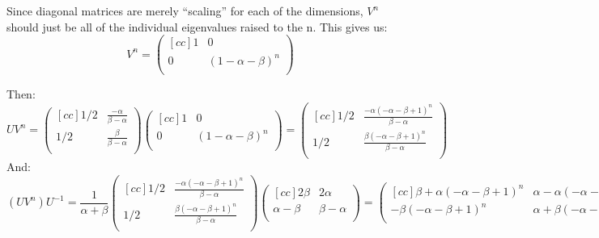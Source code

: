 \begin{enumerate}
\begin{enumerate}
       Since diagonal matrices are merely ``scaling'' for each of the dimensions, $V^n$ should just be all of the individual eigenvalues raised to the n. This gives us:
       $$
       V^n
       =
       \begin{pmatrix}[cc]
         1 & 0\\
         0 & (1-\alpha-\beta)^n\\
       \end{pmatrix}
       $$

       Then:
       $$
       UV^n
       =
       \begin{pmatrix}[cc]
         1/2 & \frac{-\alpha}{\beta - \alpha}\\
         1/2 & \frac{\beta}{\beta - \alpha}\\
       \end{pmatrix}       
       \begin{pmatrix}[cc]
         1 & 0\\
         0 & (1-\alpha-\beta)^n\\
       \end{pmatrix}
       =
       \begin{pmatrix}[cc]
         1/2 & \frac{-\alpha(-\alpha - \beta + 1)^n}{\beta - \alpha}\\
         1/2 & \frac{\beta(-\alpha - \beta + 1)^n}{\beta - \alpha}\\
       \end{pmatrix}      
       $$
       And:
       $$
       (UV^n)U^{-1}
       =
       \frac{1}{\alpha + \beta}
       \begin{pmatrix}[cc]
         1/2 & \frac{-\alpha(-\alpha - \beta + 1)^n}{\beta - \alpha}\\
         1/2 & \frac{\beta(-\alpha - \beta + 1)^n}{\beta - \alpha}\\
       \end{pmatrix}
       \begin{pmatrix}[cc]
         2 \beta & 2 \alpha\\
         \alpha - \beta & \beta - \alpha\\
       \end{pmatrix}        
       =
       \begin{pmatrix}[cc]
         \beta + \alpha(-\alpha-\beta+1)^n & \alpha - \alpha(-\alpha - \beta + 1)^n\\
         -\beta(-\alpha-\beta+1)^n & \alpha + \beta (-\alpha - \beta + 1)^n\\
       \end{pmatrix}       
       $$
       

\end{enumerate}
\end{enumerate}
